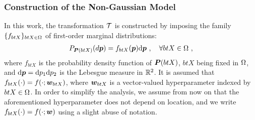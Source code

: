 \subsubsection{Construction of the Non-Gaussian Model}
\label{section: Chapter4/theory/stochastic/non_gaussian_model}

In this work, the transformation $\mathcal{T}$ is constructed by imposing the family $\{f_{btX}\}_{btX\in\Omega}$ of first-order marginal distributions:
\begin{align}
  P_{\boldsymbol{P}(btX)}(d\boldsymbol{p}) = f_{btX}(\boldsymbol{p})\mathrm{d}\boldsymbol{p}~, \quad \forall btX \in \Omega~,
\end{align}
where $f_{btX}$ is the probability density function of $\boldsymbol{P}(btX)$, $btX$ being fixed in $\Omega$, and $\mathrm{d}\boldsymbol{p}=\mathrm{d}p_1\mathrm{d}p_2$ is the Lebesgue measure in $\mathbb{R}^2$. It is assumed that $f_{btX}(\cdot) = f(\cdot; \boldsymbol{w}_{btX})$, where $\boldsymbol{w}_{btX}$ is a vector-valued hyperparameter indexed by $btX \in \Omega$. In order to simplify the analysis, we assume from now on that the aforementioned hyperparameter does not depend on location, and we write $f_{btX}(\cdot) = f(\cdot; \boldsymbol{w})$ using a slight abuse of notation.

